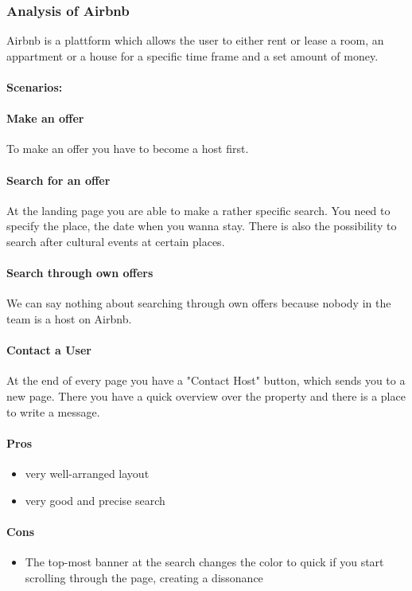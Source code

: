 	\subsubsection{Analysis of Airbnb}
		Airbnb is a plattform which allows the user to either rent or lease a room, an appartment or a house for a specific time frame and a set amount of money.
		
		\paragraph{Scenarios:}
		
		\paragraph{Make an offer}
		To make an offer you have to become a host first.
		
		\paragraph{Search for an offer}
		At the landing page you are able to make a rather specific search. You need to specify the place, the date when you wanna stay. There is also the possibility to search after cultural events at certain places.
		
		\paragraph{Search through own offers}
		We can say nothing about searching through own offers because nobody in the team is a host on Airbnb.
		
		\paragraph{Contact a User}
		At the end of every page you have a "Contact Host" button, which sends you to a new page. There you have a quick overview over the property and there is a place to write a message.
		
		\paragraph{Pros}
		\begin{itemize}
			\item very well-arranged layout
			\item very good and precise search
		\end{itemize}
	
		\paragraph{Cons}
		\begin{itemize}
			\item The top-most banner at the search changes the color to quick if you start scrolling through the page, creating a dissonance
		\end{itemize}
	